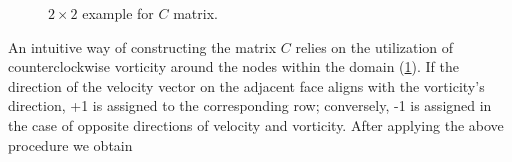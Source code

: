 \documentclass{article}
\numberwithin{equation}{section}
\begin{document}
\begin{figure}[H] %
  \caption{$2\times 2$ example for $C$ matrix.}\label{fig:C-example-2x2}
\end{figure}
An intuitive way of constructing the matrix $C$ relies on the utilization of counterclockwise vorticity around the nodes within the domain (\cref{fig:C-example-2x2}). If the direction of the velocity vector on the adjacent face aligns with the vorticity's direction, +1 is assigned to the corresponding row; conversely, -1 is assigned in the case of opposite directions of velocity and vorticity. After applying the above procedure we obtain
\end{document}
